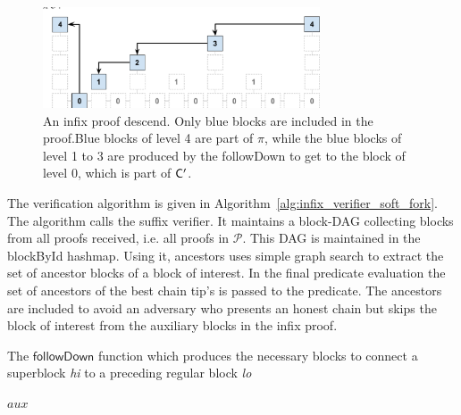 \begin{figure}[h!]
	\begin{center}
		\includegraphics[width=0.73\textwidth]{figures/infix.pdf}
	\end{center}
	\caption{An infix proof descend. Only blue blocks are included in the proof.Blue blocks of level 4 are part of $\pi$, while the blue blocks of level 1 to 3 are produced by the \textsf{followDown} to get to the block of level 0, which is part of $\mathsf{C}'$.} 
	\label{fig:infix_soft_fork}
\end{figure}

The verification algorithm is given in Algorithm~\ref{alg:infix_verifier_soft_fork}. The algorithm calls the suffix verifier. It maintains a block-DAG collecting blocks from all proofs received, i.e. all proofs in $\mathcal{P}$. 
This DAG is maintained in the \textsf{blockById} hashmap. Using it, \textsf{ancestors} uses simple graph search to extract the set of ancestor blocks of a block of interest. In the final predicate evaluation the set of ancestors of the best chain tip's is passed to the predicate. The ancestors are included to avoid an adversary who presents an honest chain but skips the block of interest from the auxiliary blocks in the infix proof.

\begin{algorithm}[h!]
	\caption{\label{alg:followDown_soft_fork}The $\textsf{followDown}$ function which produces the necessary blocks to connect a superblock \textit{hi} to a preceding regular block \textit{lo}~\cite{nipopows}}
	\begin{algorithmic}[1]
            \Else
            \EndIf
        \EndWhile
        \State\Return$aux$
      \EndFunction
	\end{algorithmic}
\end{algorithm}

